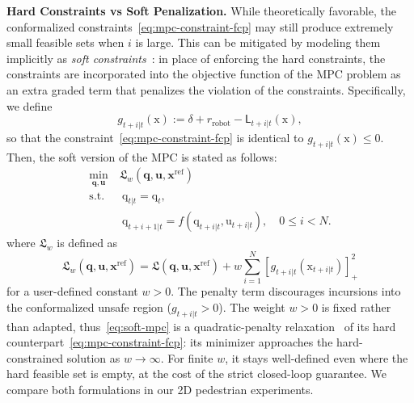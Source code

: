 \documentclass[lettersize,journal]{IEEEtran}
\begin{document}
\noindent
{\bf Hard Constraints vs Soft Penalization.}
While theoretically favorable, the conformalized constraints~\eqref{eq:mpc-constraint-fcp} may still produce extremely small feasible sets when $i$ is large. 
This can be mitigated by modeling them implicitly as \emph{soft constraints}~\cite{scokaert1999feasibility,kerrigan2000soft}: in place of enforcing the hard constraints, the constraints are incorporated into the objective function of the MPC problem as an extra graded term that penalizes the violation of the constraints. Specifically, we define
\begin{equation}
g_{t+i|t}(\mathrm{x}):=  \delta + r_{\text{robot}}  - \mathsf{L}_{t+i|t}(\mathrm{x}),
\label{eq:soft_margin}
\end{equation}
so that the constraint~\eqref{eq:mpc-constraint-fcp} is identical to $g_{t+i|t}(\mathrm{x})\le 0$. Then, the soft version of the MPC is stated as follows:
\begin{align}\label{eq:soft-mpc}
\min_{\mathbf{q}, \mathbf{u}}&\ \mathfrak{L}_{w}(\mathbf{q}, \mathbf{u}, \mathbf{x}^{\text{ref}}) \\
\text{s.t.}
&\ \ \mathrm{q}_{t|t} = \mathrm{q}_t, \nonumber \\
&\ \ \mathrm{q}_{t+i+1|t} = f(\mathrm{q}_{t+i|t}, \mathrm{u}_{t+i|t}), \quad 0 \leq i < N. \nonumber
\end{align}
where $\mathfrak{L}_{w}$ is defined as
\begin{equation*}
\mathfrak{L}_{w}(\mathbf{q}, \mathbf{u}, \mathbf{x}^{\text{ref}}) = \mathfrak{L}(\mathbf{q}, \mathbf{u}, \mathbf{x}^{\text{ref}}) + w \sum_{i=1}^N \left[ g_{t+i|t}(\mathrm{x}_{t+i|t}) \right]^2_+
\end{equation*}
for a user-defined constant $w > 0$. The penalty term discourages incursions into the conformalized unsafe region ($g_{t+i|t}>0$). The weight $w>0$ is fixed rather than adapted, thus~\eqref{eq:soft-mpc} is a quadratic-penalty relaxation~\cite{nocedal2006numerical} of its hard counterpart~\eqref{eq:mpc-constraint-fcp}: its minimizer approaches the hard-constrained solution as $w\to\infty$. For finite $w$, it stays well-defined even where the hard feasible set is empty, at the cost of the strict closed-loop guarantee. We compare both formulations in our 2D pedestrian experiments.

\end{document}
